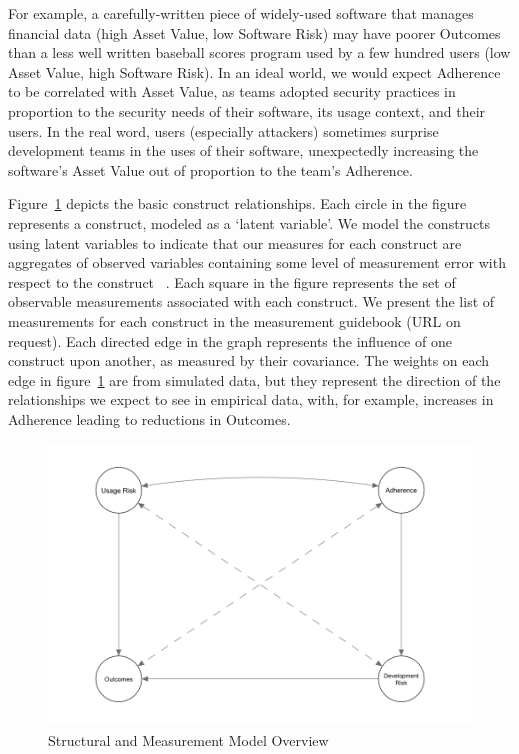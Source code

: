 For example, a carefully-written piece of widely-used software that manages financial data (high Asset Value, low Software Risk) may have poorer Outcomes than a less well written baseball scores program used by a few hundred users (low Asset Value, high Software Risk). In an ideal world, we would expect Adherence to be correlated with Asset Value, as teams adopted security practices in proportion to the security needs of their software, its usage context, and their users. In the real word, users (especially attackers) sometimes surprise development teams in the uses of their software, unexpectedly increasing the software's Asset Value out of proportion to the team's Adherence. 

Figure~\ref{fig:model_constructs} depicts the basic construct relationships. Each circle in the figure represents a construct, modeled as a `latent variable'. We model the constructs using latent variables to indicate that our measures for each construct are aggregates of observed variables containing some level of measurement error with respect to the construct ~\cite{kline2015principles,borsboom2008latent}. Each square in the figure represents the set of observable measurements associated with each construct. We present the list of measurements for each construct in the measurement guidebook (URL on request). Each directed edge in the graph represents the influence of one construct upon another, as measured by their covariance. The weights on each edge in figure~\ref{fig:model_constructs} are from simulated data, but they represent the direction of the relationships we expect to see in empirical data, with, for example, increases in Adherence leading to reductions in Outcomes. 

\begin{figure}
		\includegraphics[width=\columnwidth]{modelzeroB}
	\caption{Structural and Measurement Model Overview}
	\label{fig:model_constructs}
\end{figure}

